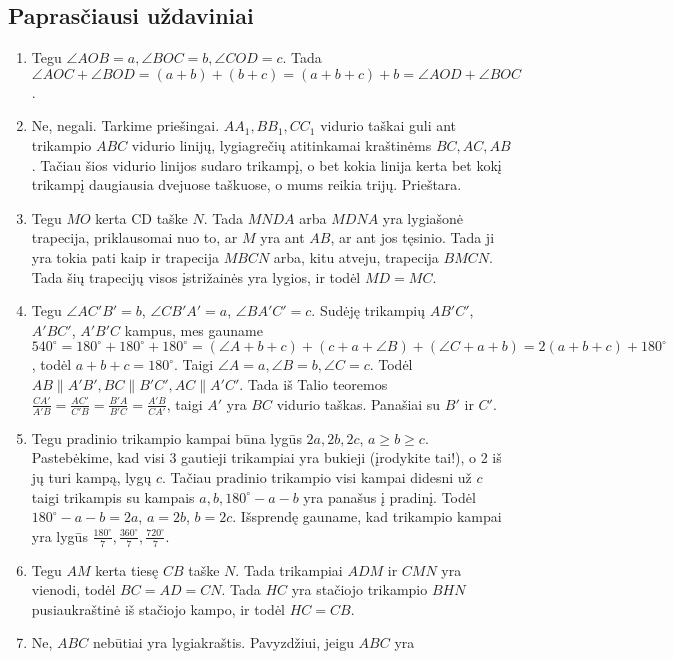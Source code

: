 \subsection*{Paprasčiausi uždaviniai} 
\begin{enumerate}
\item
  Tegu $\angle AOB = a, \angle BOC = b, \angle COD = c$.  Tada $\angle AOC
  +\angle BOD = (a+b)+(b+c)=(a+b+c)+b= \angle AOD + \angle BOC$.
\item
  Ne, negali. Tarkime priešingai. $AA_1, BB_1, CC_1$ vidurio taškai guli
  ant trikampio $ABC$ vidurio linijų, lygiagrečių atitinkamai kraštinėms
  $BC, AC, AB$. Tačiau šios vidurio linijos sudaro trikampį, o bet kokia
  linija kerta bet kokį trikampį daugiausia dvejuose taškuose, o mums
  reikia trijų. Prieštara.
\item
  Tegu $MO$ kerta CD taške $N$. Tada $MNDA$ arba $MDNA$ yra lygiašonė
  trapecija, priklausomai nuo to, ar $M$ yra ant $AB$, ar ant jos tęsinio.
  Tada ji yra tokia pati kaip ir trapecija $MBCN$ arba, kitu atveju,
  trapecija $BMCN$.  Tada šių trapecijų visos įstrižainės yra lygios, ir
  todėl $MD = MC$.
\item
  Tegu $\angle AC'B' = b$, $\angle CB'A' =a$, $\angle BA'C' = c$. Sudėję
  trikampių $AB'C'$, $A'BC'$, $A'B'C$ kampus, mes gauname $540^\circ=
  180^\circ+180^\circ +180^\circ = (\angle A +b+c) + (c+a+\angle B ) +
  (\angle C +a+b) = 2(a+b+c)+180^\circ$, todėl $a+b+c = 180^\circ$. Taigi
  $ \angle A = a ,\angle B = b, \angle C =c $. Todėl $AB\parallel{A'B'},
  BC\parallel{B'C'}, AC\parallel{A'C'}$.  Tada iš Talio teoremos
  $\frac{CA'}{A'B} = \frac{AC'}{C'B} = \frac{B'A}{B'C} = \frac{A'B}{CA'}$,
  taigi $A'$ yra $BC$ vidurio taškas.  Panašiai su $B'$ ir $C'$.
\item
  Tegu pradinio trikampio kampai būna lygūs $2a, 2b, 2c$, $a \geq b \geq
  c$. Pastebėkime, kad visi 3 gautieji trikampiai yra bukieji (įrodykite
  tai!), o 2 iš jų turi kampą, lygų $c$. Tačiau pradinio trikampio visi
  kampai didesni už $c$ taigi trikampis su kampais $a, b, 180^\circ-a-b$
  yra panašus į pradinį. Todėl $180^\circ-a-b = 2a $, $a = 2b$, $b = 2c$.
  Išsprendę gauname, kad trikampio kampai yra lygūs $\frac{180^\circ}{7},
  \frac{360^\circ}{7}, \frac{720^\circ}{7}$. 
\item
  Tegu $AM$ kerta tiesę $CB$ taške $N$. Tada trikampiai $ADM$ ir $CMN$ yra
  vienodi, todėl $BC = AD = CN$. Tada $HC$ yra stačiojo trikampio $BHN$
  pusiaukraštinė iš stačiojo kampo, ir todėl $HC = CB$. 
\item
  Ne, $ABC$ nebūtiai yra lygiakraštis. Pavyzdžiui, jeigu $ABC$ yra

\end{enumerate}
